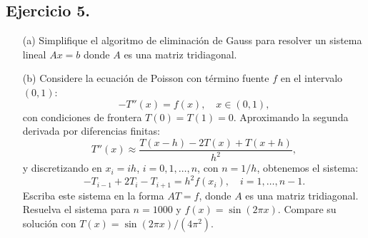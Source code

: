 
\subsection*{Ejercicio 5.}
\begin{enumerate}
    \item[(a)] Simplifique el algoritmo de eliminación de Gauss para resolver un sistema lineal $Ax = b$ donde $A$ es una matriz tridiagonal.
    \item[(b)] Considere la ecuación de Poisson con término fuente $f$ en el intervalo $(0, 1)$:
    \[
    -T''(x) = f(x), \quad x \in (0, 1),
    \]
    con condiciones de frontera $T(0) = T(1) = 0$. Aproximando la segunda derivada por diferencias finitas:
    \[
    T''(x) \approx \frac{T(x-h) - 2T(x) + T(x+h)}{h^2},
    \]
    y discretizando en $x_i = i h$, $i = 0, 1, \ldots, n$, con $n = 1/h$, obtenemos el sistema:
    \[
    -T_{i-1} + 2T_i - T_{i+1} = h^2 f(x_i), \quad i = 1, \ldots, n-1.
    \]
    Escriba este sistema en la forma $A T = f$, donde $A$ es una matriz tridiagonal. Resuelva el sistema para $n = 1000$ y $f(x) = \sin(2\pi x)$. Compare su solución con $T(x) = \sin(2\pi x) / (4\pi^2)$.
\end{enumerate}